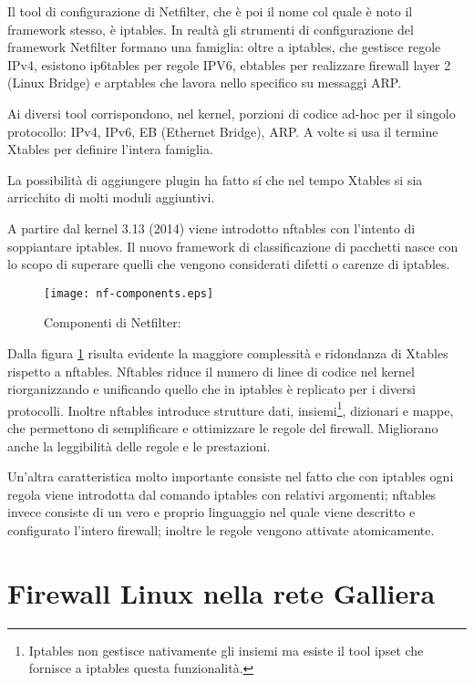 Il tool di configurazione di Netfilter, che è poi il nome col quale è noto il
framework stesso, è iptables.
In realtà gli strumenti di configurazione del framework Netfilter formano una
famiglia: oltre a iptables, che gestisce regole IPv4, esistono ip6tables per
regole IPV6, ebtables per realizzare firewall layer 2 (Linux Bridge)
e arptables che lavora nello specifico su messaggi ARP.

Ai diversi tool corrispondono, nel kernel, porzioni di codice ad-hoc per il
singolo protocollo: IPv4, IPv6, EB (Ethernet Bridge), ARP.  A volte si usa
il termine Xtables per definire l'intera famiglia.

La possibilità di aggiungere plugin ha fatto s\'i che nel tempo Xtables si
sia arricchito di molti moduli aggiuntivi.

A partire dal kernel 3.13 (2014) viene introdotto nftables con l'intento
di soppiantare iptables.  Il nuovo framework di classificazione di pacchetti
nasce con lo scopo di superare quelli che vengono considerati difetti o
carenze di iptables.
\begin{figure}[H]
    \texttt{[image: nf-components.eps]}
    \caption[Componenti di Netfilter]{Componenti di Netfilter:\footnotemark}
    \label{fig:netfilter}
\end{figure}
\noindent Dalla figura \ref{fig:netfilter} risulta evidente la maggiore complessità e
%
ridondanza di Xtables rispetto a nftables.  Nftables riduce il numero di linee
di codice nel kernel riorganizzando e unificando quello che in iptables è
replicato per i diversi protocolli.  Inoltre nftables introduce strutture
dati, insiemi\footnote{Iptables non gestisce nativamente gli insiemi ma esiste
il tool ipset che fornisce a iptables questa funzionalità.}, dizionari e mappe,
che permettono di semplificare e ottimizzare le regole del firewall.
Migliorano anche la leggibilità delle regole e le prestazioni.

Un'altra caratteristica molto importante consiste nel fatto che con iptables
ogni regola viene introdotta dal comando iptables con relativi
argomenti; nftables invece consiste di un vero e proprio linguaggio nel quale
viene descritto e configurato l'intero firewall; inoltre le regole vengono
attivate atomicamente.

\chapter{Firewall Linux nella rete Galliera}

